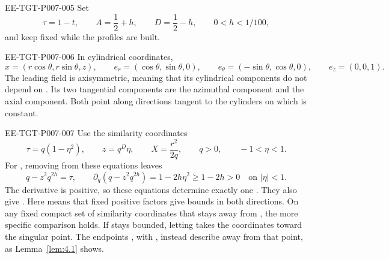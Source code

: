 \begin{EESegment}{EE-TGT-P007-005}
Set
\[
 \tau=1-t,\qquad A=\frac12+h,\qquad D=\frac12-h,
 \qquad 0<h<1/100,
\]
and keep  fixed while the profiles are built.
\end{EESegment}

\begin{EESegment}{EE-TGT-P007-006}
In cylindrical coordinates,
\[
 x=(r\cos\theta,r\sin\theta,z),\qquad
 e_r=(\cos\theta,\sin\theta,0),\qquad
 e_\theta=(-\sin\theta,\cos\theta,0),\qquad
 e_z=(0,0,1).
\]
The leading field
is axisymmetric, meaning that its cylindrical components do not depend on
. Its two tangential components are the azimuthal component and the
axial component. Both point along directions tangent to the cylinders on which
 is constant.
\end{EESegment}

\begin{EESegment}{EE-TGT-P007-007}
Use the similarity coordinates
\begin{equation}
 \tau=q(1-\eta^2),\qquad z=q^D\eta,\qquad X=\frac{r^2}{2q},
 \qquad q>0,\qquad -1<\eta<1.
 \tag{3.2}\label{eq:3.2}
\end{equation}
For , removing  from these equations leaves
\[
 q-z^2q^{2h}=\tau,\qquad
 \partial_q(q-z^2q^{2h})=1-2h\eta^2\geq 1-2h>0
 \quad\text{on }|\eta|<1.
\]
The derivative is positive, so these equations determine exactly one
. They also give
. Here
 means that fixed positive factors give bounds in both directions.
On any fixed compact set of similarity coordinates that stays away from
, the more specific comparison
 holds. If  stays bounded, letting
 takes the coordinates toward the singular point. The endpoints
, with , instead describe
 away from that point, as Lemma~\ref{lem:4.1} shows.
\end{EESegment}

